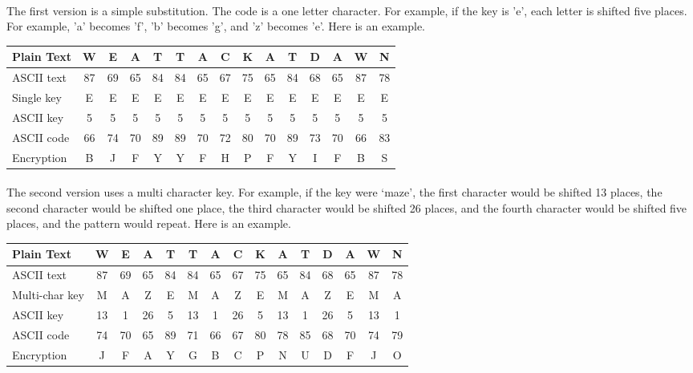 \documentclass{article}
\begin{document}
\paragraph{}The first version is a simple substitution. The code is a one letter character. For example, if the key is 'e', each letter is shifted five places. For example, 'a' becomes 'f', 'b' becomes 'g', and 'z' becomes 'e'. Here is an example.

\footnotesize{
\begin{longtable}{|p{.75in}|c|c|c|c|c|c|c|c|c|c|c|c|c|c|}
\hline
Plain Text & W & E & A & T & T & A & C & K & A & T & D & A & W & N  \\
\hline
ASCII text & 87 & 69 & 65 & 84 & 84 & 65 & 67 & 75 & 65 & 84 & 68 & 65 & 87 & 78 \\
\hline
Single key & E & E & E & E & E & E & E & E & E & E & E & E & E & E \\
\hline
ASCII key & 5 & 5 & 5 & 5 & 5 & 5 & 5 & 5 & 5 & 5 & 5 & 5 & 5 & 5 \\
\hline
ASCII code & 66 & 74 & 70 & 89 & 89 & 70 & 72 & 80 & 70 & 89 & 73 & 70 & 66 & 83 \\ 
\hline
Encryption & B & J & F & Y & Y & F & H & P & F & Y & I & F & B & S \\
\hline
\end{longtable}
}

\paragraph{}The second version uses a multi character key. For example, if the key were `maze', the first character would be shifted 13 places, the second character would be shifted one place, the third character would be shifted 26 places, and the fourth character would be shifted five places, and the pattern would repeat. Here is an example.

\footnotesize{
\begin{longtable}{|p{.75in}|c|c|c|c|c|c|c|c|c|c|c|c|c|c|}
\hline
Plain Text & W & E & A & T & T & A & C & K & A & T & D & A & W & N  \\
\hline
ASCII text &87 & 69 & 65 & 84 & 84 & 65 & 67 & 75 & 65 & 84 & 68 & 65 & 87 & 78 \\
\hline
Multi-char key & M & A & Z & E & M & A & Z & E & M & A & Z & E & M & A \\
\hline
ASCII key & 13 & 1 & 26 & 5 & 13 & 1 & 26 & 5 & 13 & 1 & 26 & 5 & 13 & 1 \\
\hline
ASCII code & 74 & 70 & 65 & 89 & 71 & 66 & 67 & 80 & 78 & 85 & 68 & 70 & 74 & 79 \\
\hline
Encryption & J & F & A & Y & G & B & C & P & N & U & D & F & J & O \\
\hline
\end{longtable}
}
\end{document}
